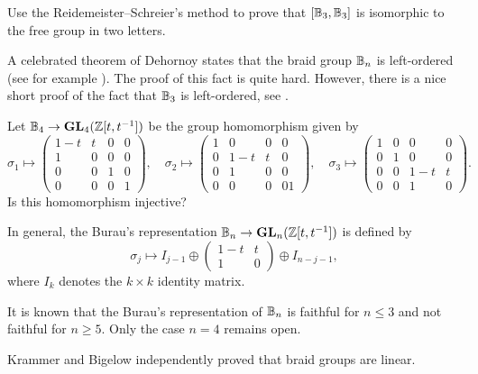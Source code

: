 \begin{exercise}
\label{xca:derivedB3}
    Use the Reidemeister--Schreier's method to prove that 
    $[\mathbb{B}_3,\mathbb{B}_3]$ is isomorphic to the free group in two letters.
\end{exercise}

A celebrated theorem of Dehornoy states that the braid group $\mathbb{B}_n$ 
is left-ordered (see for example \cite[Theorem 7.15]{MR2435235}). The proof of this fact is quite hard. However, 
there is a nice short proof of the fact that 
$\mathbb{B}_3$ is left-ordered, see 
\cite[\S7.2]{MR3560661}.

\begin{problem}
    Let $\mathbb{B}_4\to\mathbf{GL}_4(\mathbb{Z}[t,t^{-1}])$ be the group 
    homomorphism given by
    \[
    \sigma_1\mapsto\begin{pmatrix}
    1-t&t&0&0\\
    1&0&0&0\\
    0&0&1&0\\
    0&0&0&1
    \end{pmatrix},
    \quad
    \sigma_2\mapsto\begin{pmatrix}
    1&0&0&0\\
    0&1-t&t&0\\
    0&1&0&0\\
    0&0&0&01
    \end{pmatrix},
    \quad
    \sigma_3\mapsto\begin{pmatrix}
    1&0&0&0\\
    0&1&0&0\\
    0&0&1-t&t\\
    0&0&1&0
    \end{pmatrix}.
    \]
    Is this homomorphism injective?
\end{problem}

In general, the Burau's representation
$\mathbb{B}_n\to\mathbf{GL}_{n}(\mathbb{Z}[t,t^{-1}])$ 
is defined
by
\[
\sigma_j\mapsto
I_{j-1}\oplus
\begin{pmatrix}
1-t & t\\
1 & 0
\end{pmatrix}
\oplus
I_{n-j-1},
\]
where $I_k$ denotes the $k\times k$ identity matrix. 

It is known that the Burau's representation of $\mathbb{B}_n$ is faithful
for $n\leq3$ and not faithful for $n\geq5$. Only the case
$n=4$ remains open.

Krammer \cite{MR1888796} and Bigelow \cite{MR1815219} 
independently proved that braid groups are linear. 

